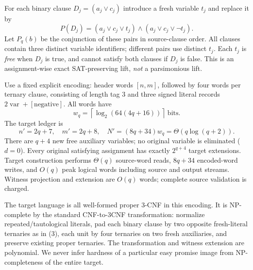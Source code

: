 \documentclass[11pt]{article}
\begin{document}
For each binary clause $D_j=(a_j\lor c_j)$ introduce a fresh variable
$t_j$ and replace it by
\[
P(D_j)=(a_j\lor c_j\lor t_j)
\land(a_j\lor c_j\lor\neg t_j).\tag{3}
\]
Let $P_q(b)$ be the conjunction of these pairs in source-clause
order. All clauses contain three distinct variable identifiers;
different pairs use distinct $t_j$. Each $t_j$ is \emph{free}
when $D_j$ is true, and cannot satisfy both clauses if $D_j$ is
false. This is an assignment-wise exact SAT-preserving lift,
\emph{not} a parsimonious lift.

Use a fixed explicit encoding: header words $[n,m]$, followed by
four words per ternary clause, consisting of length tag 3 and three
signed literal records $2\operatorname{var}+[\text{negative}]$.
All words have
\[
w_q=\left\lceil\log_2(64(4q+16))\right\rceil\ \text{bits}.
\]
The target ledger is
\[
n'=2q+7,\quad m'=2q+8,\quad
N'=(8q+34)w_q=\Theta(q\log(q+2)).\tag{4}
\]
There are $q+4$ new free auxiliary variables; no original
variable is eliminated ($d=0$). Every original satisfying
assignment has exactly $2^{q+4}$ target extensions.
Target construction performs $\Theta(q)$ source-word reads,
$8q+34$ encoded-word writes, and $O(q)$ peak logical words
including source and output streams. Witness projection and
extension are $O(q)$ words; complete source validation is charged.

The target language is all well-formed proper 3-CNF in this encoding.
It is NP-complete by the standard CNF-to-3CNF transformation:
normalize repeated/tautological literals, pad each binary clause by
two opposite fresh-literal ternaries as in (3), each unit by four
ternaries on two fresh auxiliaries, and preserve existing proper
ternaries. The transformation and witness extension are polynomial.
We never infer hardness of a particular easy promise image from
NP-completeness of the entire target.
\end{document}
